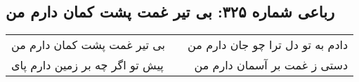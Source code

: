 \begin{center}
\section*{رباعی شماره ۳۲۵: بی تیر غمت پشت کمان دارم من}
\label{sec:sh325}
\begin{longtable}{l p{0.5cm} r}
بی تیر غمت پشت کمان دارم من
&&
دادم به تو دل ترا چو جان دارم من
\\
پیش تو اگر چه بر زمین دارم پای
&&
دستی ز غمت بر آسمان دارم من
\\
\end{longtable}
\end{center}
